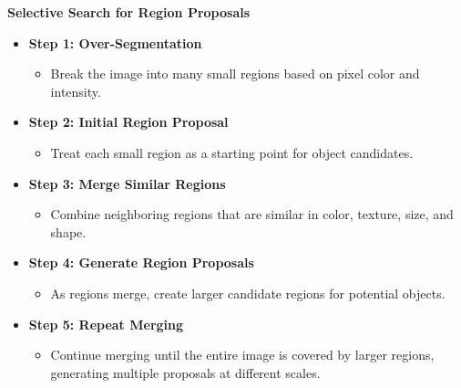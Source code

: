\documentclass{beamer}
\begin{document}
\begin{frame}{\textbf{Selective Search for Region Proposals}}
    \begin{itemize}
        \item \textbf{Step 1: Over-Segmentation}
        \begin{itemize}
            \item Break the image into many small regions based on pixel color and intensity.
        \end{itemize}
        
        \item \textbf{Step 2: Initial Region Proposal}
        \begin{itemize}
            \item Treat each small region as a starting point for object candidates.
        \end{itemize}
        
        \item \textbf{Step 3: Merge Similar Regions}
        \begin{itemize}
            \item Combine neighboring regions that are similar in color, texture, size, and shape.
        \end{itemize}

        \item \textbf{Step 4: Generate Region Proposals}
        \begin{itemize}
            \item As regions merge, create larger candidate regions for potential objects.
        \end{itemize}
        
        \item \textbf{Step 5: Repeat Merging}
        \begin{itemize}
            \item Continue merging until the entire image is covered by larger regions, generating multiple proposals at different scales.
        \end{itemize}
    \end{itemize}
\end{frame}
\end{document}
